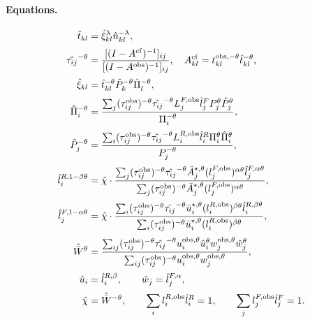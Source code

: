 \paragraph{Equations.}
\begin{align}
  \hat t_{kl}
  &=\hat\xi_{kl}^{\lambda}\hat n_{kl}^{-\lambda},
  \label{eq:hat_cong_app}\\[2pt]
  \hat{\tau_{ij}}^{-\theta}
  &=\frac{[(I-A^{\mathrm{cf}})^{-1}]_{ij}}{[(I-A^{\mathrm{obs}})^{-1}]_{ij}},
    \quad A^{\mathrm{cf}}_{kl}=t_{kl}^{\mathrm{obs},-\theta}\hat t_{kl}^{-\theta},
  \label{eq:hat_tau_app}\\[2pt]
  \hat\xi_{kl}
  &=\hat t_{kl}^{-\theta}\hat P_k^{-\theta}\hat\Pi_l^{-\theta},
  \label{eq:hat_xi_app}\\[2pt]
  \hat\Pi_i^{-\theta}
  &=\frac{\sum_j (\tau_{ij}^{\mathrm{obs}})^{-\theta}\hat{\tau_{ij}}^{-\theta}
                 L_j^{F,\mathrm{obs}}\hat l_j^F P_j^{\theta}\hat P_j^{\theta}}
             {\Pi_i^{-\theta}},
  \label{eq:hat_Pi_app}\\[2pt]
  \hat P_j^{-\theta}
  &=\frac{\sum_i (\tau_{ij}^{\mathrm{obs}})^{-\theta}\hat{\tau_{ij}}^{-\theta}
                 L_i^{R,\mathrm{obs}}\hat l_i^R \Pi_i^{\theta}\hat\Pi_i^{\theta}}
             {P_j^{-\theta}},
  \label{eq:hat_Pj_app}\\[2pt]
  \hat l_i^{R,1-\beta\theta}
  &=\hat\chi\cdot
    \frac{\sum_j (\tau_{ij}^{\mathrm{obs}})^{-\theta}\hat{\tau_{ij}}^{-\theta}
                 \bar A_j^{\star,\theta}(l_j^{F,\mathrm{obs}})^{\alpha\theta}
                 \hat l_j^{F,\alpha\theta}}
         {\sum_j (\tau_{ij}^{\mathrm{obs}})^{-\theta}
                 \bar A_j^{\star,\theta}(l_j^{F,\mathrm{obs}})^{\alpha\theta}},
  \label{eq:hat_lR_app}\\[2pt]
  \hat l_j^{F,1-\alpha\theta}
  &=\hat\chi\cdot
    \frac{\sum_i (\tau_{ij}^{\mathrm{obs}})^{-\theta}\hat{\tau_{ij}}^{-\theta}
                 \bar u_i^{\star,\theta}(l_i^{R,\mathrm{obs}})^{\beta\theta}
                 \hat l_i^{R,\beta\theta}}
         {\sum_i (\tau_{ij}^{\mathrm{obs}})^{-\theta}
                 \bar u_i^{\star,\theta}(l_i^{R,\mathrm{obs}})^{\beta\theta}},
  \label{eq:hat_lF_app}\\[2pt]
  \hat{\bar W}^{\theta}
  &=\frac{\sum_{ij}(\tau_{ij}^{\mathrm{obs}})^{-\theta}\hat{\tau_{ij}}^{-\theta}
                   u_i^{\mathrm{obs},\theta}\hat u_i^{\theta}
                   w_j^{\mathrm{obs},\theta}\hat w_j^{\theta}}
          {\sum_{ij}(\tau_{ij}^{\mathrm{obs}})^{-\theta}
                   u_i^{\mathrm{obs},\theta}w_j^{\mathrm{obs},\theta}},
  \label{eq:hat_W_app}\\[2pt]
  \hat u_i&=\hat l_i^{R,\beta},\qquad
  \hat w_j=\hat l_j^{F,\alpha},
  \label{eq:hat_uw_app}\\[2pt]
  \hat\chi&=\hat{\bar W}^{-\theta},
  \qquad
  \sum_i l_i^{R,\mathrm{obs}}\hat l_i^R=1,
  \qquad
  \sum_j l_j^{F,\mathrm{obs}}\hat l_j^F=1.
  \label{eq:hat_norm_app}
\end{align}

